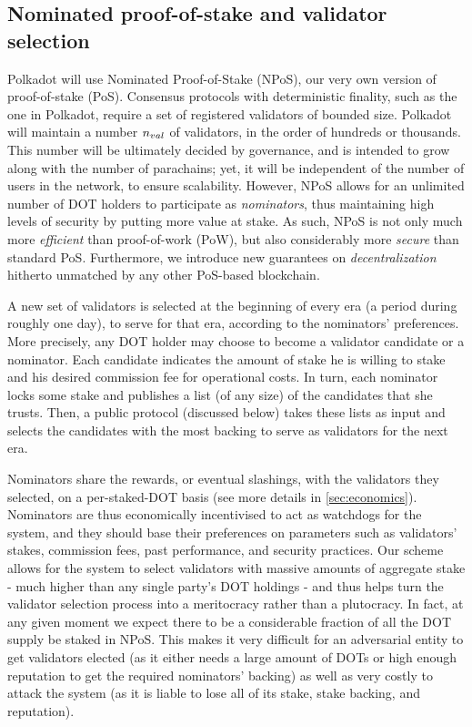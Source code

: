 \subsection{Nominated proof-of-stake and validator selection}\label{sec:validators}
Polkadot will use Nominated Proof-of-Stake (NPoS), our very own version of proof-of-stake (PoS).
Consensus protocols with deterministic finality, such as the one in Polkadot, require a set of registered validators of bounded size.
Polkadot will maintain a number $n_{val}$ of validators, in the order of hundreds or thousands.
This number will be ultimately decided by governance, and is intended to grow along with the number of parachains;
yet, it will be independent of the number of users in the network, to ensure scalability.
However, NPoS allows for an unlimited number of DOT holders to participate as \emph{nominators},
thus maintaining high levels of security by putting more value at stake.
As such, NPoS is not only much more \emph{efficient} than proof-of-work (PoW),
but also considerably more \emph{secure} than standard PoS.
Furthermore, we introduce new guarantees on \emph{decentralization} hitherto unmatched by any other PoS-based blockchain.

A new set of validators is selected at the beginning of every era (a period during roughly one day),
to serve for that era, according to the nominators' preferences.
More precisely, any DOT holder may choose to become a validator candidate or a nominator.
Each candidate indicates the amount of stake he is willing to stake and his desired commission fee for operational costs.
In turn, each nominator locks some stake and publishes a list (of any size) of the candidates that she trusts.
Then, a public protocol (discussed below) takes these lists as input and selects the candidates
with the most backing to serve as validators for the next era.

Nominators share the rewards, or eventual slashings, with the validators they selected, on a per-staked-DOT basis
(see more details in \autoref{sec:economics}).
Nominators are thus economically incentivised to act as watchdogs for the system, and they should base their preferences 
on parameters such as validators' stakes, commission fees, past performance, and security practices.
Our scheme allows for the system to select validators with massive amounts of aggregate stake
- much higher than any single party's DOT holdings -
and thus helps turn the validator selection process into a meritocracy rather than a plutocracy.
In fact, at any given moment we expect there to be a considerable fraction of all the DOT supply be staked in NPoS.
This makes it very difficult for an adversarial entity to get validators elected
(as it either needs a large amount of DOTs or high enough reputation to get the required nominators' backing)
as well as very costly to attack the system (as it is liable to lose all of its stake, stake backing, and reputation).

